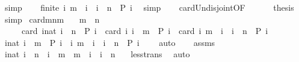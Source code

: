 \begin{isabellebody}
\ simp\isanewline
\ \ \isamarkupfalse%
\ {}{\isacharcolon}{\isacartoucheopen}finite\ {\isacharbraceleft}i{\isachardot}\ m\ {\isacharless}\ i\ {\isasymand}\ i\ {\isacharless}\ n\ {\isasymand}\ P\ i{\isacharbraceright}{\isacartoucheclose}\ \isamarkupfalse%
\ simp\isanewline
\ \ \isamarkupfalse%
\ card{\isacharunderscore}Un{\isacharunderscore}disjoint{\isacharbrackleft}OF\ {}\ {}\ {}{\isacharbrackright}\ {}\ \isamarkupfalse%
\ {\isacharquery}thesis\ \isamarkupfalse%
\ simp\isanewline
{}\isamarkupfalse%
%
\endisatagproof
{\isafoldproof}%
%
\isadelimproof
\isanewline
%
\endisadelimproof
\isanewline
{}\isamarkupfalse%
\ card{\isacharunderscore}mnm{\isacharprime}{\isacharcolon}\isanewline
\ \ \ {\isacartoucheopen}m\ {\isacharless}\ n{\isacartoucheclose}\isanewline
\ \ \ \ \ {\isacartoucheopen}card\ {\isacharbraceleft}i{\isacharcolon}{\isacharcolon}nat{\isachardot}\ i\ {\isacharless}\ n\ {\isasymand}\ P\ i{\isacharbraceright}\ {\isacharequal}\ card\ {\isacharbraceleft}i{\isachardot}\ i\ {\isacharless}\ m\ {\isasymand}\ P\ i{\isacharbraceright}\ {\isacharplus}\ card\ {\isacharbraceleft}i{\isachardot}\ m\ {\isasymle}\ i\ {\isasymand}\ i\ {\isacharless}\ n\ {\isasymand}\ P\ i{\isacharbraceright}{\isacartoucheclose}\isanewline
%
\isadelimproof
%
\endisadelimproof
%
\isatagproof
{}\isamarkupfalse%
\ {\isacharminus}\isanewline
\ \ \isamarkupfalse%
\ {}{\isacharcolon}{\isacartoucheopen}{\isacharbraceleft}i{\isacharcolon}{\isacharcolon}nat{\isachardot}\ i\ {\isacharless}\ m\ {\isasymand}\ P\ i{\isacharbraceright}\ {\isasyminter}\ {\isacharbraceleft}i{\isachardot}\ m\ {\isasymle}\ i\ {\isasymand}\ i\ {\isacharless}\ n\ {\isasymand}\ P\ i{\isacharbraceright}\ {\isacharequal}\ {\isacharbraceleft}{\isacharbraceright}{\isacartoucheclose}\ \isamarkupfalse%
\ auto\isanewline
\ \ \isamarkupfalse%
\ assms\ \isamarkupfalse%
\ {\isacartoucheopen}{\isasymforall}i{\isacharcolon}{\isacharcolon}nat{\isachardot}\ i\ {\isacharless}\ n\ {\isacharequal}\ {\isacharparenleft}i\ {\isacharless}\ m{\isacharparenright}\ {\isasymor}\ {\isacharparenleft}m\ {\isasymle}\ i\ {\isasymand}\ i\ {\isacharless}\ n{\isacharparenright}{\isacartoucheclose}\ \ \isamarkupfalse%
\ less{\isacharunderscore}trans\ \isamarkupfalse%
\ auto\isanewline
\ \ \isamarkupfalse%

\end{isabellebody}
